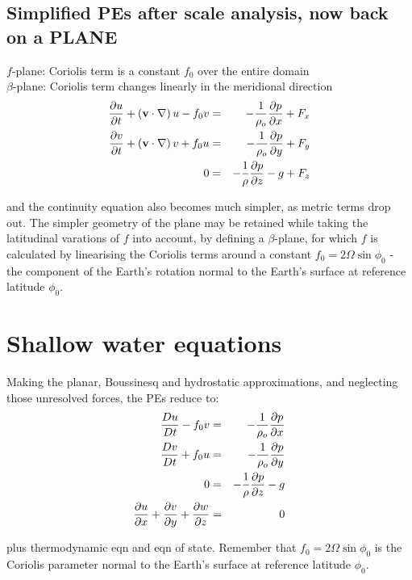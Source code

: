 \subsection{Simplified PEs after scale analysis, now back on a PLANE}

$f$-plane: Coriolis term is a constant $f_0$ over the entire domain\\
$\beta$-plane: Coriolis term changes linearly in the meridional direction\\

\begin{eqnarray}
	\frac{\partial u}{\partial t} + \left( \mathbf{v} \cdot \nabla\right) u - f_0 v & = & -\frac{1}{\rho_o}\frac{\partial p}{\partial x} +F_x \\
	\frac{\partial v}{\partial t} + \left( \mathbf{v} \cdot \nabla\right) v + f_0 u & = & -\frac{1}{\rho_o}\frac{\partial p}{\partial y} +F_y \nonumber \\
	0 & = & - \frac{1}{\rho} \frac{\partial p}{\partial z} - g + F_z \nonumber
\end{eqnarray}

and the continuity equation also becomes much simpler, as metric terms drop out. The simpler geometry of the plane may be retained while taking the latitudinal varations of $f$ into account, by defining a $\beta$-plane, for which $f$ is calculated by linearising the Coriolis terms around a constant $f_0=2\Omega \sin\phi_0$ -
the component of the Earth's rotation normal to the Earth's surface at
reference latitude $\phi_0$. 	


\section{Shallow water equations}

Making the planar, Boussinesq and hydrostatic approximations, and neglecting those unresolved forces, 
the PEs reduce to:
\begin{eqnarray}
	\frac{D u}{D t}-f_0 v & = & -\frac{1}{\rho_o}\frac{\partial p}{\partial x} \\
	\frac{D v}{D t}+f_0 u & = & -\frac{1}{\rho_o}\frac{\partial p}{\partial y} \nonumber \\
	0 & = & - \frac{1}{\rho} \frac{\partial p}{\partial z} - g \nonumber  \\
	\frac{\partial u}{\partial x}+\frac{\partial v}{\partial y}+\frac{\partial w}{\partial z} & = & 0 \nonumber
\end{eqnarray}

plus thermodynamic eqn and eqn of state. Remember that $f_0=2\Omega \sin\phi_0$ is the Coriolis parameter normal to the Earth's surface at
reference latitude $\phi_0$.

